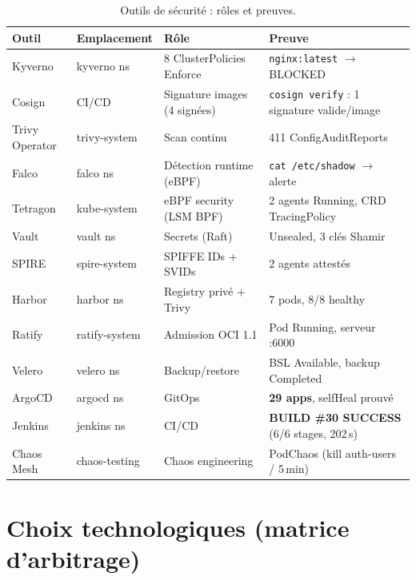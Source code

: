 \documentclass[12pt,a4paper,openany]{report}
\begin{document}
\begin{table}[h]
\centering
\small
\begin{tabular}{@{}llll@{}}
\toprule
\textbf{Outil} & \textbf{Emplacement} & \textbf{Rôle} & \textbf{Preuve} \\
\midrule
Kyverno & kyverno ns & 8 ClusterPolicies Enforce & \texttt{nginx:latest} $\rightarrow$ BLOCKED \\
Cosign & CI/CD & Signature images (4 signées) & \texttt{cosign verify} : 1 signature valide/image \\
Trivy Operator & trivy-system & Scan continu & 411 ConfigAuditReports \\
Falco & falco ns & Détection runtime (eBPF) & \texttt{cat /etc/shadow} $\rightarrow$ alerte \\
Tetragon & kube-system & eBPF security (LSM BPF) & 2 agents Running, CRD TracingPolicy \\
Vault & vault ns & Secrets (Raft) & Unsealed, 3 clés Shamir \\
SPIRE & spire-system & SPIFFE IDs + SVIDs & 2 agents attestés \\
Harbor & harbor ns & Registry privé + Trivy & 7 pods, 8/8 healthy \\
Ratify & ratify-system & Admission OCI 1.1 & Pod Running, serveur :6000 \\
Velero & velero ns & Backup/restore & BSL Available, backup Completed \\
ArgoCD & argocd ns & GitOps & \textbf{29 apps}, selfHeal prouvé \\
Jenkins & jenkins ns & CI/CD & \textbf{BUILD \#30 SUCCESS} (6/6 stages, 202\,s) \\
Chaos Mesh & chaos-testing & Chaos engineering & PodChaos (kill auth-users / 5\,min) \\
\bottomrule
\end{tabular}
\caption{Outils de sécurité : rôles et preuves.}
\label{tab:outils-secu}
\end{table}

\section{Choix technologiques (matrice d'arbitrage)}
\end{document}
